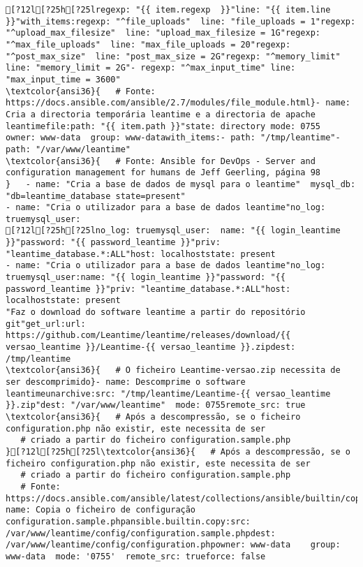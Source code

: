 \documentclass{scrartcl}
\begin{document}
\begin{Verbatim}
[?12l[?25h[?25lregexp: "{{ item.regexp  }}"line: "{{ item.line }}"with_items:regexp: "^file_uploads"  line: "file_uploads = 1"regexp: "^upload_max_filesize"  line: "upload_max_filesize = 1G"regexp: "^max_file_uploads"  line: "max_file_uploads = 20"regexp: "^post_max_size"  line: "post_max_size = 2G"regexp: "^memory_limit"  line: "memory_limit = 2G"- regexp: "^max_input_time" line: "max_input_time = 3600"
\textcolor{ansi36}{   # Fonte: https://docs.ansible.com/ansible/2.7/modules/file_module.html}- name: Cria a directoria temporária leantime e a directoria de apache leantimefile:path: "{{ item.path }}"state: directory mode: 0755    owner: www-data  group: www-datawith_items:- path: "/tmp/leantime"- path: "/var/www/leantime"
\textcolor{ansi36}{   # Fonte: Ansible for DevOps - Server and configuration management for humans de Jeff Geerling, página 98
}   - name: "Cria a base de dados de mysql para o leantime"  mysql_db: "db=leantime_database state=present"
- name: "Cria o utilizador para a base de dados leantime"no_log: truemysql_user:
[?12l[?25h[?25lno_log: truemysql_user:  name: "{{ login_leantime }}"password: "{{ password_leantime }}"priv: "leantime_database.*:ALL"host: localhoststate: present
- name: "Cria o utilizador para a base de dados leantime"no_log: truemysql_user:name: "{{ login_leantime }}"password: "{{ password_leantime }}"priv: "leantime_database.*:ALL"host: localhoststate: present
"Faz o download do software leantime a partir do repositório git"get_url:url: https://github.com/Leantime/leantime/releases/download/{{ versao_leantime }}/Leantime-{{ versao_leantime }}.zipdest: /tmp/leantime
\textcolor{ansi36}{   # O ficheiro Leantime-versao.zip necessita de ser descomprimido}- name: Descomprime o software leantimeunarchive:src: "/tmp/leantime/Leantime-{{ versao_leantime }}.zip"dest: "/var/www/leantime"  mode: 0755remote_src: true
\textcolor{ansi36}{   # Após a descompressão, se o ficheiro configuration.php não existir, este necessita de ser
   # criado a partir do ficheiro configuration.sample.php
}[?12l[?25h[?25l\textcolor{ansi36}{   # Após a descompressão, se o ficheiro configuration.php não existir, este necessita de ser
   # criado a partir do ficheiro configuration.sample.php
   # Fonte: https://docs.ansible.com/ansible/latest/collections/ansible/builtin/copy_module.html}- name: Copia o ficheiro de configuração configuration.sample.phpansible.builtin.copy:src: /var/www/leantime/config/configuration.sample.phpdest: /var/www/leantime/config/configuration.phpowner: www-data    group: www-data  mode: '0755'  remote_src: trueforce: false

\end{Verbatim}
\end{document}
